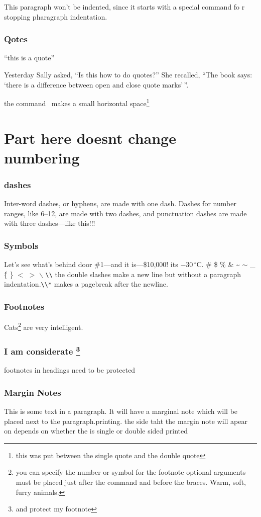 \documentclass[12pt,twoside,leqno]{article}%
\begin{document}
\noindent This paragraph won't be indented, since it starts with a special command fo r stopping pharagraph indentation.
\section{Qotes}
``this is a quote''

Yesterday Sally asked, ``Is this how to do quotes?'' She recalled, ``The book says: `there is a difference between open and close quote marks'\,''.

the command \, makes a small horizontal space\footnote{this was put between the single quote and the double quote}
\part{Part here doesnt change numbering}
\section{dashes}
Inter-word dashes, or hyphens, are made with one dash. Dashes for number ranges, like 6--12, are made with two dashes, and punctuation dashes are made with three dashes---like this!!!
\section{Symbols}Let's see what's behind door \#1---and it is---\$10,000!
its $-30\,^{\circ}\mathrm{C}$.
\# \$ \% \& \~{} $\sim$ \_ \^ \{ \} $<$ $>$ $\backslash$ \verb!\\! the double slashes make a new line but without a paragraph indentation.\verb!\\*! makes a pagebreak after the newline.
\section{Footnotes}
Cats\footnote[5]{you can specify the number or symbol for the footnote optional arguments must be placed just after the command and before the braces. Warm, soft, furry animals.} are very intelligent.
\section{I am considerate \protect\footnote{and protect my footnote}}
footnotes in headings need to be protected
\section{Margin Notes}
This is some text in a paragraph. It will have a marginal note\normalmarginpar {} which will be placed next to the paragraph.printing.\reversemarginpar{} the side taht the margin note will apear on depends on whether the is single or double sided printed
\end{document}
